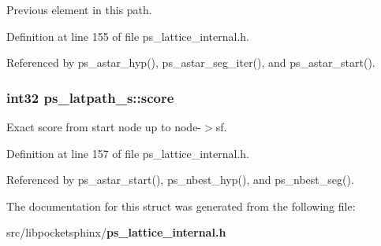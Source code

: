 Previous element in this path. 



Definition at line 155 of file ps\-\_\-lattice\-\_\-internal.\-h.



Referenced by ps\-\_\-astar\-\_\-hyp(), ps\-\_\-astar\-\_\-seg\-\_\-iter(), and ps\-\_\-astar\-\_\-start().

\subsubsection[{score}]{\setlength{\rightskip}{0pt plus 5cm}int32 ps\-\_\-latpath\-\_\-s\-::score}\label{structps__latpath__s_a9249fb528f754db992df1d494a69b580}


Exact score from start node up to node-\/$>$sf. 



Definition at line 157 of file ps\-\_\-lattice\-\_\-internal.\-h.



Referenced by ps\-\_\-astar\-\_\-start(), ps\-\_\-nbest\-\_\-hyp(), and ps\-\_\-nbest\-\_\-seg().



The documentation for this struct was generated from the following file\-:\begin{DoxyCompactItemize}
\item 
src/libpocketsphinx/{\bf ps\-\_\-lattice\-\_\-internal.\-h}\end{DoxyCompactItemize}
